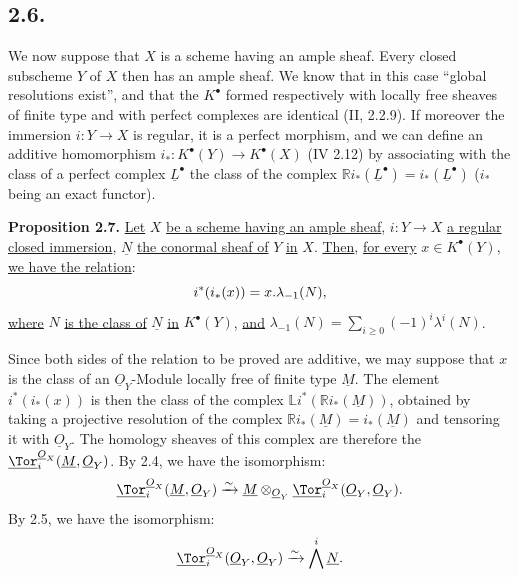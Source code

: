 \subsection*{2.6.}
We now suppose that \(X\) is a scheme having an ample sheaf. Every closed subscheme \(Y\) of \(X\) then has an ample sheaf. We know that in this case ``global resolutions exist'', and that the \(K^{\bullet}\) formed respectively with locally free sheaves of finite type and with perfect complexes are identical (II, 2.2.9). If moreover the immersion \(i:Y\to X\) is regular, it is a perfect morphism, and we can define an additive homomorphism \(i_*:K^{\bullet}(Y)\longrightarrow K^{\bullet}(X)\) (IV 2.12) by associating with the class of a perfect complex \(\underline{L}^\bullet\) the class of the complex \(\mathbb Ri_*(\underline{L}^\bullet)=i_*(\underline{L}^\bullet)\) (\(i_*\) being an exact functor).

\textbf{Proposition 2.7.} \uline{Let} \(X\) \uline{be a scheme having an ample sheaf}, \(i:Y\to X\) \uline{a regular closed immersion}, \(\underline{N}\) \uline{the conormal sheaf of} \(Y\) \uline{in} \(X\). \uline{Then}, \uline{for every} \(x\in K^{\bullet}(Y)\), \uline{we have the relation}:
\begin{equation}\notag
i^*(i_*(x))=x.\lambda_{-1}(N),
\end{equation}
\uline{where} \(N\) \uline{is the class of} \(\underline{N}\) \uline{in} \(K^{\bullet}(Y)\), \uline{and} \(\lambda_{-1}(N)=\sum_{i\ge0}(-1)^i\lambda^i(N)\).

%
Since both sides of the relation to be proved are additive, we may suppose that \(x\) is the class of an \(\underline{O}_Y\)-Module locally free of finite type \(\underline{M}\). The element \(i^*(i_*(x))\) is then the class of the complex \(\mathbb L i^*(\mathbb Ri_*(\underline{M}))\), obtained by taking a projective resolution of the complex \(\mathbb Ri_*(\underline{M})=i_*(\underline{M})\) and tensoring it with \(\underline{O}_Y\). The homology sheaves of this complex are therefore the \(\underline{\Tor}_i^{\underline{O}_X}(\underline{M},\underline{O}_Y)\). By 2.4, we have the isomorphism:
\[
\underline{\Tor}_i^{\underline{O}_X}(\underline{M},\underline{O}_Y)
\xrightarrow{\sim}
\underline{M}\otimes_{\underline{O}_Y}\underline{\Tor}_i^{\underline{O}_X}(\underline{O}_Y,\underline{O}_Y).
\]
By 2.5, we have the isomorphism:
\[
\underline{\Tor}_i^{\underline{O}_X}(\underline{O}_Y,\underline{O}_Y)
\xrightarrow{\sim}
\bigwedge^i\underline{N}.
\]

